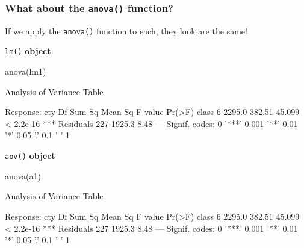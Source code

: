 \documentclass[a4paper]{article}
\begin{document}
\subsubsection{What about the \lstinline|anova()| function?}
If we apply the \lstinline|anova()| function to each, they look are the same!\\
\begin{minipage}[t]{0.49\textwidth}
\lstinline|lm()| \textbf{object}
\begin{Schunk}
\begin{Sinput}
anova(lm1)
\end{Sinput}
\begin{Soutput}
Analysis of Variance Table

Response: cty
           Df Sum Sq Mean Sq F value    Pr(>F)    
class       6 2295.0  382.51  45.099 < 2.2e-16 ***
Residuals 227 1925.3    8.48                      
---
Signif. codes:  0 '***' 0.001 '**' 0.01 '*' 0.05 '.' 0.1 ' ' 1
\end{Soutput}
\end{Schunk}
\end{minipage}
\hspace{0.02\textwidth}
\begin{minipage}[t]{0.49\textwidth}
\lstinline|aov()| \textbf{object}
\begin{Schunk}
\begin{Sinput}
anova(a1)
\end{Sinput}
\begin{Soutput}
Analysis of Variance Table

Response: cty
           Df Sum Sq Mean Sq F value    Pr(>F)    
class       6 2295.0  382.51  45.099 < 2.2e-16 ***
Residuals 227 1925.3    8.48                      
---
Signif. codes:  0 '***' 0.001 '**' 0.01 '*' 0.05 '.' 0.1 ' ' 1
\end{Soutput}
\end{Schunk}
\end{minipage}
\end{document}
